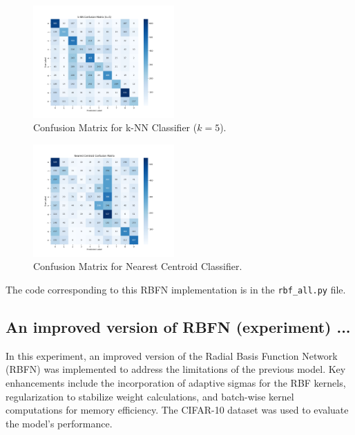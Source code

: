 \documentclass[lettersize,journal]{IEEEtran}
\begin{document}
\begin{figure}[H]
    \centering
    \includegraphics[width=0.48\textwidth]{conf_matrix_knn_k5.png}
    \caption{Confusion Matrix for k-NN Classifier ($k=5$).}
    \label{fig:conf-matrix-knn5}
\end{figure}

\begin{figure}[H]
    \centering
    \includegraphics[width=0.48\textwidth]{conf_matrix_centroid.png}
    \caption{Confusion Matrix for Nearest Centroid Classifier.}
    \label{fig:conf-matrix-centroid}
\end{figure}

The code corresponding to this RBFN implementation is in the \texttt{rbf\_all.py} file.

\subsection{\textbf{An improved version of RBFN (experiment) ...}}
In this experiment, an improved version of the Radial Basis Function Network (RBFN) was implemented to address the limitations of the previous model. Key enhancements include the incorporation of adaptive sigmas for the RBF kernels, regularization to stabilize weight calculations, and batch-wise kernel computations for memory efficiency. The CIFAR-10 dataset was used to evaluate the model's performance.
\end{document}
